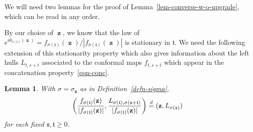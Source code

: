 \documentclass[11pt]{article}
\theoremstyle{plain}
\newtheorem{lem}[thm]{Lemma}
\theoremstyle{definition}
\numberwithin{equation}{section}
\newcommand{\op}{\operatorname}
\newcommand{\eqD}{\overset{d}{=}}
\newcommand{\zz}{{\op{\mathbf{z}}}}
\newcommand{\tz}{{\mathfrak t}}
\newcommand{\sz}{{\mathfrak s}}
\let\originalleft\left
\let\originalright\right
\renewcommand{\left}{\mathopen{}\mathclose\bgroup\originalleft}
\renewcommand{\right}{\aftergroup\egroup\originalright}
\begin{document}
We will need two lemmas for the proof of Lemma~\ref{lem-converse-w-o-upgrade}, which can be read in any order. 

 

By our choice of $\zz$, we know that the law of $e^{i \theta_{\sigma(\tz)}(\zz)} = f_{\sigma(\tz)}(\zz) / |f_{\sigma(\tz)}(\zz)|$ is stationary in $\tz$. We need the following extension of this stationarity property which also gives information about the left hulls $L_{t,s+t}$ associated to the conformal maps $f_{t,s+t}$ which appear in the concatenation property~\eqref{eqn-conc}. 

\begin{lem} 
With $\sigma = \sigma_{\zz}$ as in Definition~\ref{defn-sigma}, 
\[
\left( \frac{ f_{\sigma(\tz)}(\zz) }{|f_{\sigma(\tz)}(\zz)| } , \frac{ L_{ \sigma(\tz), \sigma(\sz+\tz)} }{ |f_{\sigma(\tz)}(\zz)| } \right) \eqD (\zz, L_{\sigma(\sz)})
\]
for each fixed $\sz ,\tz \geq 0$.
\label{lem-computation}
\end{lem}
\end{document}
